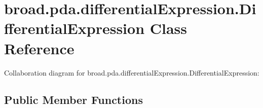 \hypertarget{classbroad_1_1pda_1_1differential_expression_1_1_differential_expression}{\section{broad.\+pda.\+differential\+Expression.\+Differential\+Expression Class Reference}
\label{classbroad_1_1pda_1_1differential_expression_1_1_differential_expression}
}


Collaboration diagram for broad.\+pda.\+differential\+Expression.\+Differential\+Expression\+:
\subsection*{Public Member Functions}
